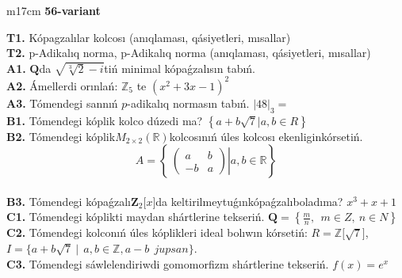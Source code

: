 \documentclass{article}
\begin{document}
\begin{tabular}{m{17cm}}
\textbf{56-variant}
\newline

\textbf{T1.} Kópagzalılar kolcosı (anıqlaması, qásiyetleri, mısallar) \\
\textbf{T2.} p-Adikalıq norma, p-Adikalıq norma (anıqlaması, qásiyetleri, mısallar) \\
\textbf{A1.} \(\mathbf{Q}\)da \(\sqrt{\sqrt[3]{2} - i}\)tiń minimal kópaǵzalısın tabıń. \\
\textbf{A2.} Ámellerdi orınlań: \(\mathbb{Z}_{5}\) te \(\left( x^{2} + 3x - 1 \right)^{2}\) \\
\textbf{A3.} Tómendegi sannıń \(p\)-adikalıq normasın tabıń. \(|48|_{3} =\) \\
\textbf{B1.} Tómendegi kóplik kolco dúzedi ma? \(\left\{ a + b\sqrt{7}|a,b \in R \right\}\) \\
\textbf{B2.} Tómendegi kóplik\(M_{2 \times 2}\left( \mathbb{R} \right)\)kolcosınıń úles kolcosı ekenliginkórsetiń.
\[A = \left\{ \left. \ \begin{pmatrix}
a & b \\
 - b & a
\end{pmatrix} \right|a,b\mathbb{\in R} \right\}\] \\
\textbf{B3.} Tómendegi kópaǵzalı\(\mathbf{Z}_{2}\lbrack x\rbrack\)da keltirilmeytuǵınkópaǵzalıboladıma? \(x^{3} + x + 1\) \\
\textbf{C1.} Tómendegi kóplikti maydan shártlerine tekseriń. \(\mathbf{Q} = \left\{ \frac{m}{n},\ \ m \in Z,\ n \in N \right\}\) \\
\textbf{C2.} Tómendegi kolconıń úles kóplikleri ideal bolıwın kórsetiń:
\(R\mathbb{= Z\lbrack}\sqrt{7}\rbrack\), \(I = \{ a + b\sqrt{7}\ |\ \ a,b \in \mathbb{Z,}a - b\ \ jupsan\}\). \\
\textbf{C3.} Tómendegi sáwlelendiriwdi gomomorfizm shártlerine tekseriń. \(f(x) = e^{x}\) \\

\end{tabular}
\vspace{1cm}
\end{document}
